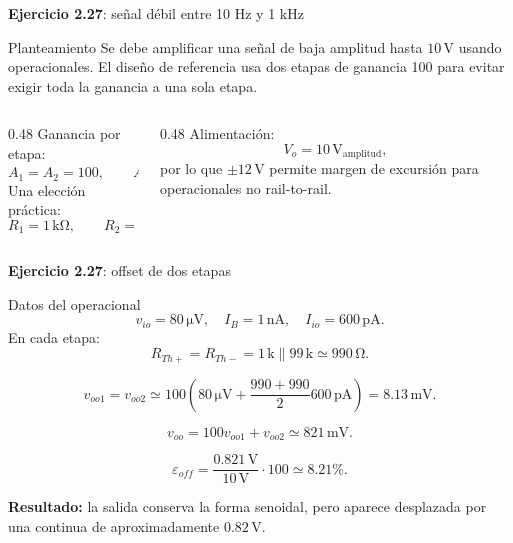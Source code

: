 \documentclass[aspectratio=169,9pt]{beamer}
\newcommand{\exercise}[1]{\textbf{Ejercicio #1}}
\newcommand{\result}[1]{\textbf{\color{eiTeal}Resultado:} #1}
\newcommand{\unit}[1]{\,\mathrm{#1}}
\begin{document}
\begin{frame}{\exercise{2.27}: señal débil entre 10 Hz y 1 kHz}
  \begin{block}{Planteamiento}
    Se debe amplificar una señal de baja amplitud hasta \(10\unit{V}\) usando operacionales. El diseño de referencia usa dos etapas de ganancia 100 para evitar exigir toda la ganancia a una sola etapa.
  \end{block}

  \begin{columns}[T,onlytextwidth]
    \begin{column}{0.48\textwidth}
      Ganancia por etapa:
      \[
        A_1=A_2=100,\qquad A_T=10^4.
      \]
      Una elección práctica:
      \[
        R_1=1\unit{k\Omega},\qquad R_2=99\unit{k\Omega}.
      \]
    \end{column}
    \begin{column}{0.48\textwidth}
      Alimentación:
      \[
        V_o=10\unit{V}_{\text{amplitud}},
      \]
      por lo que \(\pm 12\unit{V}\) permite margen de excursión para operacionales no rail-to-rail.
    \end{column}
  \end{columns}
\end{frame}

\begin{frame}{\exercise{2.27}: offset de dos etapas}
  \begin{block}{Datos del operacional}
    \[
      v_{io}=80\unit{\mu V},\quad I_B=1\unit{nA},\quad I_{io}=600\unit{pA}.
    \]
    En cada etapa:
    \[
      R_{Th+}=R_{Th-}=1\unit{k}\parallel 99\unit{k}\simeq 990\unit{\Omega}.
    \]
  \end{block}

  \[
    v_{oo1}=v_{oo2}\simeq
    100\left(80\unit{\mu V}+\frac{990+990}{2}600\unit{pA}\right)
    =8.13\unit{mV}.
  \]

  \[
    v_{oo}=100v_{oo1}+v_{oo2}\simeq 821\unit{mV}.
  \]

  \[
    \varepsilon_{off}=\frac{0.821\unit{V}}{10\unit{V}}\cdot100\simeq 8.21\%.
  \]

  \result{la salida conserva la forma senoidal, pero aparece desplazada por una continua de aproximadamente \(0.82\unit{V}\).}
\end{frame}
\end{document}
